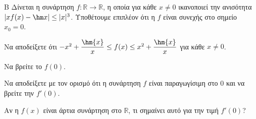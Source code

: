\begin{thema}{Β}
Δίνεται η συνάρτηση $f: \mathbb{R} \to \mathbb{R}$, η οποία για κάθε $x \ne 0$ ικανοποιεί την ανισότητα $\left| x f(x) - \hm x \right| \le |x|^3$. Υποθέτουμε επιπλέον ότι η $f$ είναι συνεχής στο σημείο $x_0=0$.
\begin{erwthma}
  \item Να αποδείξετε ότι $ -x^2+\dfrac{\hm{x}}{x}\le f(x)\leq x^2+\dfrac{\hm{x}}{x}$ για κάθε $x\neq 0$.
  \item Να βρείτε το $f(0)$.
  \item Να αποδείξετε με τον ορισμό ότι η συνάρτηση $f$ είναι παραγωγίσιμη στο $0$ και να βρείτε την $f'(0)$.
  \item Αν η $f(x)$ είναι άρτια συνάρτηση στο $\mathbb{R}$, τι σημαίνει αυτό για την τιμή $f'(0)$?
\end{erwthma}
\end{thema}
